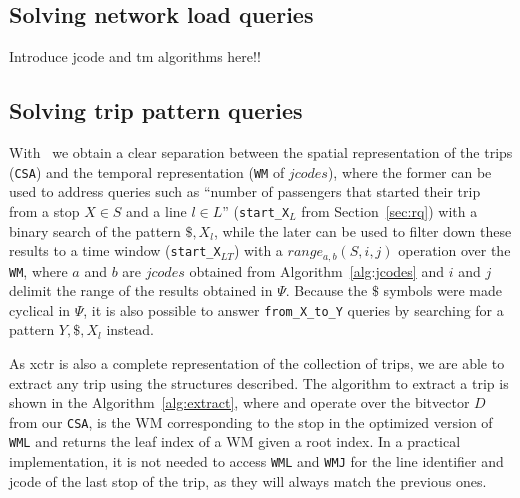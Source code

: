 	\subsection{Solving network load queries}
	Introduce jcode and \gls{tm} algorithms here!!
	
	\subsection{Solving trip pattern queries}
	With \ttctr~we obtain a clear separation between the spatial representation of the trips (\texttt{CSA}) and the temporal representation (\texttt{WM} of $jcodes$), where the former can be used to address queries such as ``number of passengers that started their trip from a stop $X\in S$ and a line $l\in L$'' (\texttt{start\_X$_{L}$} from Section~\ref{sec:rq}) with a binary search of the pattern $\$,X_l$, while the later can be used to filter down these results to a time window (\texttt{start\_X$_{LT}$}) with a $range_{a,b}(S,i,j)$ operation over the \texttt{WM}, where $a$ and $b$ are $jcodes$ obtained from Algorithm~\ref{alg:jcodes} and $i$ and $j$ delimit the range of the results obtained in $\Psi$. Because the $\$$ symbols were made cyclical in $\Psi$, it is also possible to answer \texttt{from\_X\_to\_Y} queries by searching for a pattern $Y,\$,X_l$ instead.
	
	As \gls{xctr} is also a complete representation of the collection of trips, we are able to extract any trip using the structures described.  The algorithm to extract a trip is shown in the Algorithm~\ref{alg:extract}, where  and  operate over the bitvector $D$ from our \texttt{CSA},  is the WM corresponding to the stop  in the optimized version of \texttt{WML} and  returns the leaf index of a WM given a root index. In a practical implementation, it is not needed to access \texttt{WML} and \texttt{WMJ} for the line identifier and jcode of the last stop of the trip, as they will always match the previous ones.
	
